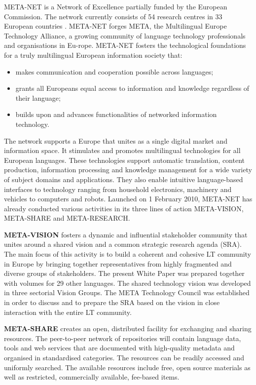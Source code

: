\begin{multicols}{2}

META-NET is a Network of Excellence partially funded by the European Commission. The network currently consists of 54 research centres in 33 European countries \cite{art10}. META-NET forges META, the Multilingual Europe Technology Alliance, a growing community of language technology professionals and organisations in Eu-rope. META-NET fosters the technological foundations for a truly multilingual European information society that:

\begin{itemize}
\item makes communication and cooperation possible across languages;
\item grants all Europeans equal access to information and knowledge regardless of their language;
\item builds upon and advances functionalities of networked information technology.
\end{itemize}

The network supports a Europe that unites as a single digital market and information space. It stimulates and promotes multilingual technologies for all European languages. These technologies support automatic translation, content production, information processing and knowledge management for a wide variety of subject domains and applications. They also enable intuitive language-based interfaces to technology ranging from household electronics, machinery and vehicles to computers and robots.
Launched on 1 February 2010, META-NET has already conducted various activities in its three lines of action META-VISION, META-SHARE and META-RESEARCH.

\textbf{META-VISION} fosters a dynamic and influential stakeholder community that unites around a shared vision and a common strategic research agenda (SRA). The main focus of this activity is to build a coherent and cohesive LT community in Europe by bringing together representatives from highly fragmented and diverse groups of stakeholders. The present White Paper was prepared together with volumes for 29 other languages. The shared technology vision was developed in three sectorial Vision Groups. The META Technology Council was established in order to discuss and to prepare the SRA based on the vision in close interaction with the entire LT community.

\textbf{META-SHARE} creates an open, distributed facility for exchanging and sharing resources. The peer-to-peer network of repositories will contain language data, tools and web services that are documented with high-quality metadata and organised in standardised categories. The resources can be readily accessed and uniformly searched. The available resources include free, open source materials as well as restricted, commercially available, fee-based items.


\end{multicols}
